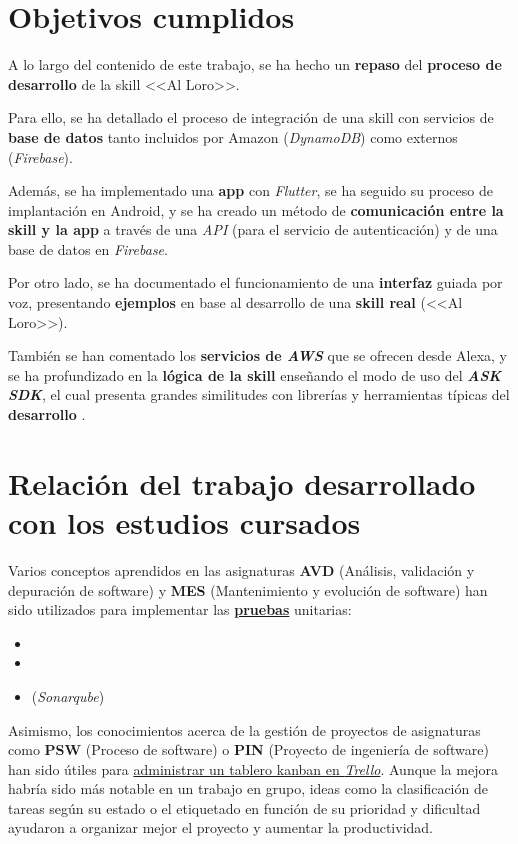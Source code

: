 \documentclass[11pt,spanish,listoffigures,listoftables,table,hyphens,dvipsnames]{tfgetsinf}
\newcommand{\fe}[1]{\foreign{english}{#1}}
\begin{document}
\section{Objetivos cumplidos}

A lo largo del contenido de este trabajo, se ha hecho un \textbf{repaso} del \textbf{proceso de desarrollo} de la skill <<Al Loro>>.

Para ello, se ha detallado el proceso de integración de una skill con servicios de \textbf{base de datos} tanto incluidos por Amazon (\emph{DynamoDB}) como externos (\emph{Firebase}).

Además, se ha implementado una \textbf{app} con \emph{Flutter}, se ha seguido su proceso de implantación en Android, y se ha creado un método de \textbf{comunicación entre la skill y la app} a través de una \emph{API} (para el servicio de autenticación) y de una base de datos en \emph{Firebase}.

Por otro lado, se ha documentado el funcionamiento de una \textbf{interfaz} guiada por voz, presentando \textbf{ejemplos} en base al desarrollo de una \textbf{skill real} (<<Al Loro>>).

También se han comentado los \textbf{servicios de \emph{AWS}} que se ofrecen desde Alexa, y se ha profundizado en la \textbf{lógica de la skill} enseñando el modo de uso del \textbf{\emph{ASK SDK}}, el cual presenta grandes similitudes con librerías y herramientas típicas del \textbf{desarrollo \fe{backend}}.

\section{Relación del trabajo desarrollado con los estudios cursados}

Varios conceptos aprendidos en las asignaturas \textbf{AVD} (Análisis, validación y depuración de software) y \textbf{MES} (Mantenimiento y evolución de software) han sido utilizados para implementar las \hyperref[capitulo:pruebas]{\textbf{pruebas}} unitarias:

\begin{itemize}
   \item {}
   \item {}
   \item {} (\emph{Sonarqube})
\end{itemize}

Asimismo, los conocimientos acerca de la gestión de proyectos de asignaturas como \textbf{PSW} (Proceso de software) o \textbf{PIN} (Proyecto de ingeniería de software) han sido útiles para \hyperref[seccion:gestion-proyecto]{administrar un tablero kanban en \emph{Trello}}. Aunque la mejora habría sido más notable en un trabajo en grupo, ideas como la clasificación de tareas según su estado o el etiquetado en función de su prioridad y dificultad ayudaron a organizar mejor el proyecto y aumentar la productividad.
\end{document}
